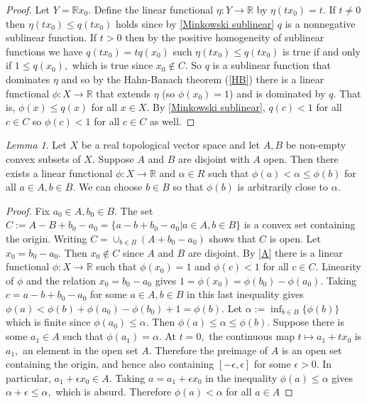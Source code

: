 \documentclass[BSc]{usydthesis}
\numberwithin{equation}{chapter}
\theoremstyle{remark}
\newtheorem{Lemma}[equation]{Lemma}
\newcommand{\R}{\mathbb{R}}
\begin{document}
\begin{proof} 
Let $Y= \R x_0.$ Define the linear functional $\eta: Y \to \R $ by $\eta(tx_0)=t.$
If $t\neq 0$ then $\eta(tx_0)\leq q(tx_0)$ holds since by \ref{Minkowski sublinear} $q$ is a nonnegative sublinear function. If $t>0$ then by the positive homogeneity of sublinear functions we have $q(tx_0) = t q(x_0)$ such $\eta(tx_0)\leq q(tx_0)$ is true if and only if $1\leq q(x_0),$ which is true since $x_0\notin C.$ So $q$ is a sublinear function that dominates $\eta$ and so by the Hahn-Banach theorem (\ref{HB}) there is a linear functional $\phi:X \to \R$ that extends $\eta$ (so $\phi(x_0)=1$) and is dominated by $q.$ That is, $\phi(x)\leq q(x)$ for all $x\in X.$ By \ref{Minkowski sublinear}, $q(c)<1$ for all $c\in C$ so $\phi(c)<1$ for all $c\in C$ as well. 
\end{proof}

\begin{Lemma} \label{B} Let $X$ be a real topological vector space and let $A, B$ be non-empty convex subsets of $X.$ Suppose $A$ and $B$ are disjoint with $A$ open. Then there exists a linear functional $\phi:X\to \R$ and $\alpha\in R$ such that $\phi(a) < \alpha \leq \phi(b)$ for all $a\in A, b\in B.$ We can choose $b\in B$ so that $\phi(b)$ is arbitrarily close to $\alpha.$

\end{Lemma}

\begin{proof} Fix $a_0\in A, b_0 \in B.$ The set $C:= A - B +b_0 - a_0 = \{ a-b+b_0-a_0 | a\in A, b\in B \}$ is a convex set containing the origin. Writing $C = \cup_{b\in B} (A+b_0-a_0)$ shows that $C$ is open. Let $x_0 = b_0-a_0.$ Then $x_0\notin C$ since $A$ and $B$ are disjoint. By \ref{A} there is a linear functional $\phi:X \to \R$ such that $\phi(x_0)=1$ and $\phi(c)<1$ for all $c\in C.$ Linearity of $\phi$ and the relation $x_0 = b_0-a_0$ gives $1= \phi(x_0) = \phi(b_0) - \phi(a_0).$ Taking $c= a-b+b_0 - a_0$ for some $a\in A, b\in B$ in this last inequality gives $\phi(a) < \phi(b)+ \phi(a_0) - \phi(b_0)+1 = \phi(b).$ Let $\alpha:= \inf_{b\in B} \{ \phi(b) \}$ which is finite since $\phi(a_0)\leq \alpha.$ Then $\phi(a)\leq \alpha \leq \phi(b).$ Suppose there is some $a_1\in A$ such that $\phi(a_1)=\alpha.$ At $t=0,$ the continuous map $t\mapsto a_1 + tx_0$ is $a_1,$ an element in the open set $A.$ Therefore the preimage of $A$ is an open set containing the origin, and hence also containing $[-\epsilon, \epsilon]$ for some $\epsilon>0.$ In particular, $a_1+\epsilon x_0 \in A.$ Taking $a= a_1+\epsilon x_0$ in the inequality $\phi(a)\leq \alpha$ gives $\alpha+\epsilon \leq \alpha,$ which is absurd. Therefore $\phi(a) < \alpha$ for all $a\in A$ 
\end{proof}
\end{document}
